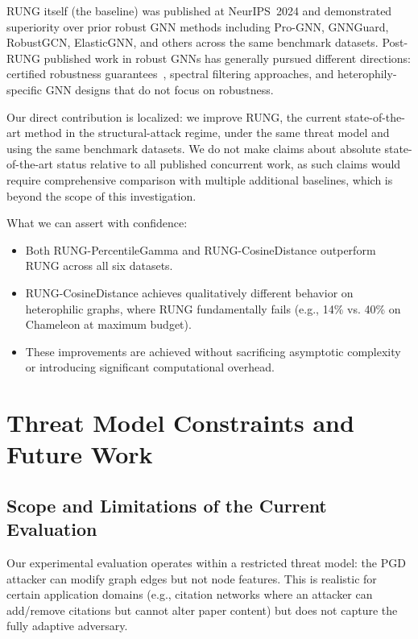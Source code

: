 \documentclass[sigconf]{acmart}
\begin{document}
RUNG itself (the baseline) was published at NeurIPS~2024 and demonstrated superiority over prior robust GNN methods including Pro-GNN, GNNGuard, RobustGCN, ElasticGNN, and others across the same benchmark datasets. Post-RUNG published work in robust GNNs has generally pursued different directions: certified robustness guarantees~\cite{zugner2019certifying}, spectral filtering approaches, and heterophily-specific GNN designs that do not focus on robustness.

Our direct contribution is localized: we improve RUNG, the current state-of-the-art method in the structural-attack regime, under the same threat model and using the same benchmark datasets. We do not make claims about absolute state-of-the-art status relative to all published concurrent work, as such claims would require comprehensive comparison with multiple additional baselines, which is beyond the scope of this investigation.

What we can assert with confidence:
\begin{itemize}
\item Both RUNG-PercentileGamma and RUNG-CosineDistance outperform RUNG across all six datasets.
\item RUNG-CosineDistance achieves qualitatively different behavior on heterophilic graphs, where RUNG fundamentally fails (e.g., 14\% vs. 40\% on Chameleon at maximum budget).
\item These improvements are achieved without sacrificing asymptotic complexity or introducing significant computational overhead.
\end{itemize}

\section{Threat Model Constraints and Future Work}
\subsection{Scope and Limitations of the Current Evaluation}

Our experimental evaluation operates within a restricted threat model: the PGD attacker can modify graph edges but not node features. This is realistic for certain application domains (e.g., citation networks where an attacker can add/remove citations but cannot alter paper content) but does not capture the fully adaptive adversary.
\end{document}

